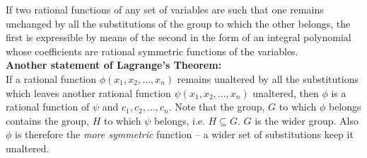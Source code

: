 \begin{theorem} If two rational functions of any set of variables are such that one remains unchanged by all the substitutions of the group to
which the other belongs, the first is expressible by means of the second in the form of an integral polynomial whose coefficients are rational symmetric functions of the variables. \\

{\bf Another statement of Lagrange's Theorem: } \\

If a rational function $\phi(x_1,x_2, \hdots, x_n)$ remains unaltered by all the substitutions which leaves another rational function $\psi(x_1, x_2, \hdots, x_n)$ unaltered, then $\phi$ is
a rational function of $\psi$ and $c_1, c_2, \hdots, c_n$. Note that the group, $G$ to which $\phi$ belongs contains the group, $H$ to which $\psi$ belongs, i.e. $H\subseteq G$. $G$ is the
wider group. Also $\phi$ is therefore the {\it more symmetric} function -- a wider set of substitutions keep it unaltered.
\end{theorem}

